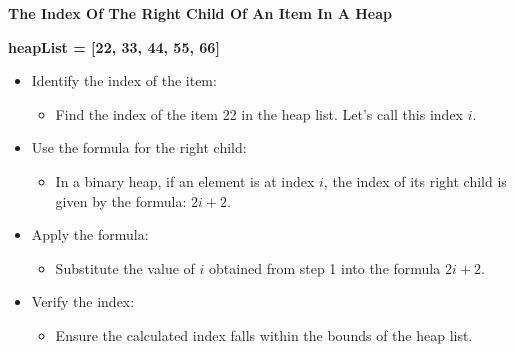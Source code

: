 \documentclass[
  letterpaper,
  DIV=11,
  numbers=noendperiod]{scrreprt}
\providecommand{\tightlist}{%
  \setlength{\itemsep}{0pt}\setlength{\parskip}{0pt}}
\begin{document}
\begin{tcolorbox}[enhanced jigsaw, colframe=quarto-callout-note-color-frame, toprule=.15mm, bottomrule=.15mm, rightrule=.15mm, colback=white, breakable, arc=.35mm, opacityback=0, left=2mm, leftrule=.75mm]

\vspace{-3mm}\textbf{The Index Of The Right Child Of An Item In A Heap}\vspace{3mm}

\textbf{heapList = {[}22, 33, 44, 55, 66{]}}

\begin{itemize}
\tightlist
\item
  Identify the index of the item:

  \begin{itemize}
  \tightlist
  \item
    Find the index of the item 22 in the heap list. Let's call this
    index \(i\).
  \end{itemize}
\item
  Use the formula for the right child:

  \begin{itemize}
  \tightlist
  \item
    In a binary heap, if an element is at index \(i\), the index of its
    right child is given by the formula: \(2i + 2\).
  \end{itemize}
\item
  Apply the formula:

  \begin{itemize}
  \tightlist
  \item
    Substitute the value of \(i\) obtained from step 1 into the formula
    \(2i+2\).
  \end{itemize}
\item
  Verify the index:

  \begin{itemize}
  \tightlist
  \item
    Ensure the calculated index falls within the bounds of the heap
    list.
  \end{itemize}
\end{itemize}

\end{tcolorbox}
\end{document}
